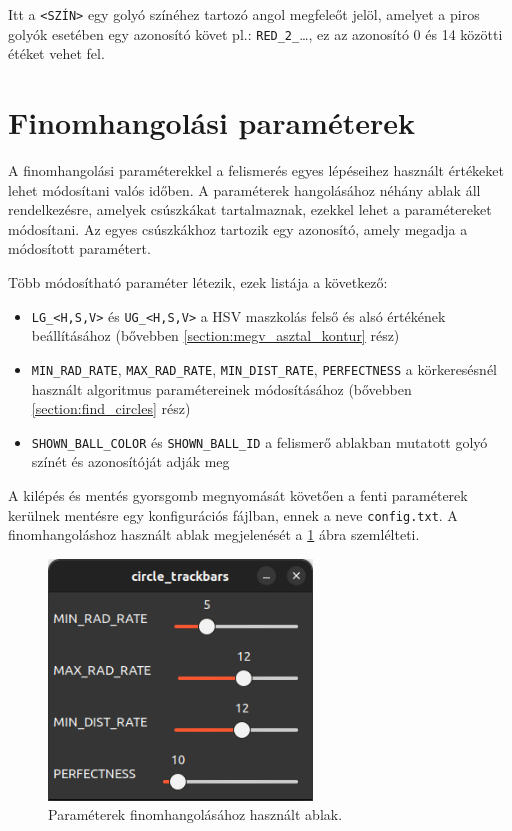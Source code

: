 \par Itt a \lstinline{<SZÍN>} egy golyó színéhez tartozó angol megfeleőt jelöl, amelyet a piros golyók esetében egy azonosító követ pl.: \lstinline{RED_2_}\dots, ez az azonosító 0 és 14 közötti étéket vehet fel.

\section{Finomhangolási paraméterek}
A finomhangolási paraméterekkel a felismerés egyes lépéseihez használt értékeket lehet módosítani valós időben. A paraméterek hangolásához néhány ablak áll rendelkezésre, amelyek csúszkákat tartalmaznak, ezekkel lehet a paramétereket módosítani. Az egyes csúszkákhoz tartozik egy azonosító, amely megadja a módosított paramétert.
\par Több módosítható paraméter létezik, ezek listája a következő:

\begin{itemize}
    \setlength\itemsep{-2pt}
    \item \lstinline{LG_<H,S,V>} és \lstinline{UG_<H,S,V>} a HSV maszkolás felső és alsó értékének beállításához (bővebben \ref{section:megv_asztal_kontur} rész)
    \item \lstinline{MIN_RAD_RATE}, \lstinline{MAX_RAD_RATE}, \lstinline{MIN_DIST_RATE}, \lstinline{PERFECTNESS} a körkeresésnél használt algoritmus paramétereinek módosításához (bővebben \ref{section:find_circles} rész)
    \item \lstinline{SHOWN_BALL_COLOR} és \lstinline{SHOWN_BALL_ID} a felismerő ablakban mutatott golyó színét és azonosítóját adják meg
\end{itemize}

\par A kilépés és mentés gyorsgomb megnyomását követően a fenti paraméterek kerülnek mentésre egy konfigurációs fájlban, ennek a neve \lstinline{config.txt}. A finomhangoláshoz használt ablak megjelenését a \ref{fig:parameter_window} ábra szemlélteti.

\begin{figure}[!ht]
    \centering
    \includegraphics[width=70mm, keepaspectratio]{figures/parameter_window.png}
    \caption{Paraméterek finomhangolásához használt ablak.}
    \label{fig:parameter_window}
\end{figure}